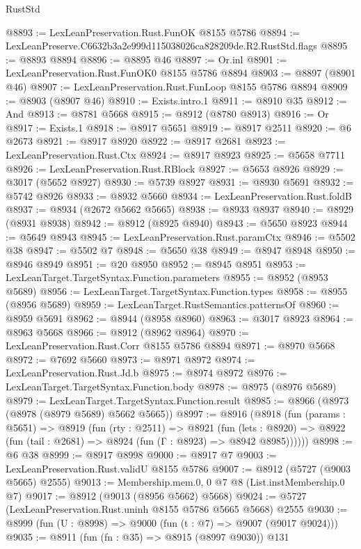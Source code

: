 \begin{lexlean}{RustStd}
\begin{coremodule}
@8893 := LexLeanPreservation.Rust.FunOK @8155 @5786
@8894 := LexLeanPreserve.C6632b3a2e999d115038026ca828209de.R2.RustStd.flags
@8895 := @8893 @8894
@8896 := @8895 @46
@8897 := Or.inl
@8901 := LexLeanPreservation.Rust.FunOK0 @8155 @5786 @8894
@8903 := @8897 (@8901 @46)
@8907 := LexLeanPreservation.Rust.FunLoop @8155 @5786 @8894
@8909 := @8903 (@8907 @46)
@8910 := Exists.intro.{1}
@8911 := @8910 @35
@8912 := And
@8913 := @8781 @5668
@8915 := @8912 (@8780 @8913)
@8916 := Or
@8917 := Exists.{1}
@8918 := @8917 @5651
@8919 := @8917 @2511
@8920 := @6 @2673
@8921 := @8917 @8920
@8922 := @8917 @2681
@8923 := LexLeanPreservation.Rust.Ctx
@8924 := @8917 @8923
@8925 := @5658 @7711
@8926 := LexLeanPreservation.Rust.RBlock
@8927 := @5653 @8926
@8929 := @3017 (@5652 @8927)
@8930 := @5739 @8927
@8931 := @8930 @5691
@8932 := @5742 @8926
@8933 := @8932 @5660
@8934 := LexLeanPreservation.Rust.foldB
@8937 := @8934 (@2672 @5662 @5665)
@8938 := @8933 @8937
@8940 := @8929 (@8931 @8938)
@8942 := @8912 (@8925 @8940)
@8943 := @5650 @8923
@8944 := @5649 @8943
@8945 := LexLeanPreservation.Rust.paramCtx
@8946 := @5502 @38
@8947 := @5502 @7
@8948 := @5650 @38
@8949 := @8947 @8948
@8950 := @8946 @8949
@8951 := @20 @8950
@8952 := @8945 @8951
@8953 := LexLeanTarget.TargetSyntax.Function.parameters
@8955 := @8952 (@8953 @5689)
@8956 := LexLeanTarget.TargetSyntax.Function.types
@8958 := @8955 (@8956 @5689)
@8959 := LexLeanTarget.RustSemantics.patternsOf
@8960 := @8959 @5691
@8962 := @8944 (@8958 @8960)
@8963 := @3017 @8923
@8964 := @8963 @5668
@8966 := @8912 (@8962 @8964)
@8970 := LexLeanPreservation.Rust.Corr @8155 @5786 @8894
@8971 := @8970 @5668
@8972 := @7692 @5660
@8973 := @8971 @8972
@8974 := LexLeanPreservation.Rust.Jd.b
@8975 := @8974 @8972
@8976 := LexLeanTarget.TargetSyntax.Function.body
@8978 := @8975 (@8976 @5689)
@8979 := LexLeanTarget.TargetSyntax.Function.result
@8985 := @8966 (@8973 (@8978 (@8979 @5689) @5662 @5665))
@8997 := @8916
    (@8918
      (fun (params : @5651) =>
      @8919
        (fun (rty : @2511) =>
        @8921
          (fun (lets : @8920) =>
          @8922 (fun (tail : @2681) => @8924 (fun (Γ : @8923) => @8942 @8985))))))
@8998 := @6 @38
@8999 := @8917 @8998
@9000 := @8917 @7
@9003 := LexLeanPreservation.Rust.validU @8155 @5786
@9007 := @8912 (@5727 (@9003 @5665) @2555)
@9013 := Membership.mem.{0, 0} @7 @8 (List.instMembership.{0} @7)
@9017 := @8912 (@9013 (@8956 @5662) @5668)
@9024 := @5727 (LexLeanPreservation.Rust.uninh @8155 @5786 @5665 @5668) @2555
@9030 := @8999 (fun (U : @8998) => @9000 (fun (t : @7) => @9007 (@9017 @9024)))
@9035 := @8911 (fun (fn : @35) => @8915 (@8997 @9030)) @131

\end{coremodule}
\end{lexlean}
